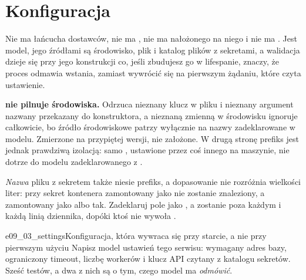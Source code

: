 \section{Konfiguracja}
\label{sec:ch09-settings}


\noindent
Nie ma łańcucha dostawców, nie ma , nie ma nałożonego
na niego  i nie ma
. Jest model, jego źródłami są środowisko, plik
 i katalog plików z sekretami, a walidacja dzieje się przy jego
konstrukcji \dash{} co, jeśli zbudujesz go w lifespanie, znaczy, że proces
odmawia wstania, zamiast wywrócić się na pierwszym żądaniu, które czyta
ustawienie.

\begin{trapbox}
\textbf{ nie pilnuje środowiska.} Odrzuca nieznany klucz
w pliku  i nieznany argument nazwany przekazany do konstruktora, a
nieznaną zmienną  w środowisku ignoruje całkowicie, bo źródło
środowiskowe patrzy wyłącznie na nazwy zadeklarowane w modelu. Zmierzone na
przypiętej wersji, nie założone. W drugą stronę prefiks jest jednak prawdziwą
izolacją: samo , ustawione przez coś innego na maszynie,
nie dotrze do modelu zadeklarowanego z .
\end{trapbox}

\begin{note}
\emph{Nazwa} pliku z sekretem także niesie prefiks, a dopasowanie nie
rozróżnia wielkości liter: przy  sekret kontenera
zamontowany jako  nie zostanie znaleziony, a zamontowany jako
 albo  \dash{} tak. Zadeklaruj pole
jako , a zostanie poza każdym  i każdą linią
dziennika, dopóki ktoś nie wywoła .
\end{note}

\begin{exercise}{e09_03_settings}{Konfiguracja, która wywraca się przy starcie, a nie przy pierwszym użyciu}
Napisz model ustawień tego serwisu: wymagany adres bazy, ograniczony timeout,
liczbę workerów i klucz API czytany z katalogu sekretów. Sześć testów, a dwa z
nich są o tym, czego model ma \emph{odmówić}.
\end{exercise}


